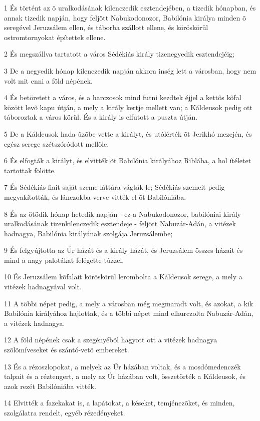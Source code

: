 \par 1 És történt az õ uralkodásának kilenczedik esztendejében, a tizedik hónapban, és annak tizedik napján, hogy feljött Nabukodonozor, Babilónia királya minden õ seregével Jeruzsálem ellen, és táborba szállott ellene, és köröskörül ostromtornyokat építettek ellene.
\par 2 És megszállva tartatott a város Sédékiás király tizenegyedik esztendejéig;
\par 3 De a negyedik hónap kilenczedik napján akkora inség lett a városban, hogy nem volt mit enni a föld népének.
\par 4 És betöretett a város, és a harczosok mind futni kezdtek éjjel a kettõs kõfal között levõ kapu útján, a mely a király kertje mellett van; a Káldeusok pedig ott táboroztak a város körül. És a király is elfutott a puszta útján.
\par 5 De a Káldeusok hada ûzõbe vette a királyt, és utólérték õt Jerikhó mezején, és egész serege szétszóródott mellõle.
\par 6 És elfogták a királyt, és elvitték õt Babilónia királyához Riblába, a hol ítéletet tartottak fölötte.
\par 7 És Sédékiás fiait saját szeme láttára vágták le; Sédékiás szemeit pedig megvakították, és lánczokba verve vitték el õt Babilóniába.
\par 8 És az ötödik hónap hetedik napján - ez a Nabukodonozor, babilóniai király uralkodásának tizenkilenczedik esztendeje - feljött Nabuzár-Adán, a vitézek hadnagya, Babilónia királyának szolgája Jeruzsálembe;
\par 9 És felgyújtotta az Úr házát és a király házát, és Jeruzsálem összes házait és mind a nagy palotákat felégette tûzzel.
\par 10 És Jeruzsálem kõfalait köröskörül lerombolta a Káldeusok serege, a mely a vitézek hadnagyával volt.
\par 11 A többi népet pedig, a mely a városban még megmaradt volt, és azokat, a kik Babilónia királyához hajlottak, és a többi népet mind elhurczolta Nabuzár-Adán, a vitézek hadnagya.
\par 12 A föld népének csak a szegényébõl hagyott ott a vitézek hadnagya szõlõmíveseket és szántó-vetõ embereket.
\par 13 És a rézoszlopokat, a melyek az Úr házában voltak, és a mosdómedenczék talpait és a réztengert, a mely az Úr házában volt, összetörték a Káldeusok, és azok rezét Babilóniába vitték.
\par 14 Elvitték a fazekakat is, a lapátokat, a késeket, temjénezõket, és minden, szolgálatra rendelt, egyéb rézedényeket.
